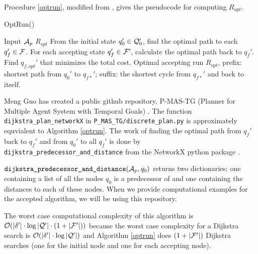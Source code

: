 Procedure \ref{optrun}, modified from \cite{guo15}, gives the pseudocode for computing $R_{opt}$.
\begin{algorithm}
\caption{OptRun()}\label{optrun}
\begin{algorithmic}[1]
\Require Input $\mathcal{A}_p$
\Ensure $R_{opt}$
\State From the initial state $q_0' \in \mathcal{Q}_0'$, find the optimal path to each $q_f' \in \mathcal{F}$.
\State For each accepting state $q_f' \in \mathcal{F}'$, calculate the optimal path back to $q_f'$. 
\State Find $q_{f,opt}'$ that minimizes the total cost.
\State Optimal accepting run $R_{opt}$, prefix: shortest path from $q_{0}'$ to  $q_{f*}'$; suffix: the shortest cycle from $q_{f*}'$ and back to itself.
\end{algorithmic}
\end{algorithm}

Meng Guo has created a public github repository, P-MAS-TG (Planner for Multiple Agent System with Temporal Goals) \cite{pMasGit}. The function \texttt{dijkstra\_plan\_networkX} in \texttt{P\_MAS\_TG/discrete\_plan.py} is approximately equvialent to Algorithm \ref{optrun}. The work of finding the optimal path from $q_f'$ back to $q_f'$ and from $q_0'$ to all $q_f'$ is done by \texttt{dijkstra\_predecessor\_and\_distance} from the NetworkX python package \cite{schult08}. 

$\texttt{dijkstra\_predecessor\_and\_distance}(\mathcal{A}_p,q_0)$ returns two dictionaries; one containing a list of all the nodes $q_0$ is a predecessor of and one containing the distances to each of these nodes. When we provide computational examples for the accepted algorithm, we will be using this repository. %


The worst case computational complexity of this algorithm is $\mathcal{O}(|\delta'| \cdot \log|\mathcal{Q}'| \cdot (1 + |\mathcal{F}'|))$ because the worst case complexity for a Dijkstra search is $\mathcal{O}(|\delta'| \cdot \log|\mathcal{Q}'| )$ and Algorithm \ref{optrun} does $(1+ |\mathcal{F}'|)$ Dijkstra searches (one for the initial node and one for each accepting node).

